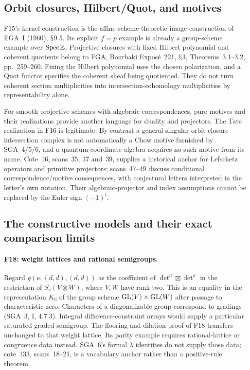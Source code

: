 \documentclass[11pt,a4paper]{article}
\renewcommand{\S}{\ensuremath{\mathsection}}
\newcommand{\fid}[1]{\textsf{#1}}\newcommand{\gate}[1]{\textsf{#1}}
\theoremstyle{named}\newtheorem{finding}{Finding}[section]
\theoremstyle{definition}\newtheorem{definition}[finding]{Definition}
\theoremstyle{remark}\newtheorem{remark}[finding]{Remark}
\begin{document}
\subsection{Orbit closures, Hilbert/Quot, and motives}
\fid{F15}'s kernel construction is the affine scheme-theoretic-image construction of EGA~I (1960), \S9.5. Its explicit $f=p$ example is already a group-scheme example over $\operatorname{Spec}\mathbb Z$. Projective closures with fixed Hilbert polynomial and coherent quotients belong to FGA, Bourbaki Expos\'e~221, \S3, Theorems~3.1--3.2, pp.~259--260. Fixing the Hilbert polynomial uses the chosen polarization, and a Quot functor specifies the coherent sheaf being quotiented. They do not turn coherent section multiplicities into intersection-cohomology multiplicities by representability alone.

For smooth projective schemes with algebraic correspondences, pure motives and their realizations provide another language for duality and projectors. The Tate realization in \fid{F16} is legitimate. By contrast a general singular orbit-closure intersection complex is not automatically a Chow motive furnished by SGA~4/5/6, and a quantum coordinate algebra acquires no such motive from its name. Cote~16, scans~35, 37 and~39, supplies a historical anchor for Lefschetz operators and primitive projectors; scans~47--49 discuss conditional correspondence/motive consequences, with conjectural letters interpreted in the letter's own notation. Their algebraic-projector and index assumptions cannot be replaced by the Euler sign $(-1)^i$.

\subsection{The constructive models and their exact comparison limits}
\paragraph{\fid{F18}: weight lattices and rational semigroups.}
Regard $g(\nu,(d,d),(d,d))$ as the coefficient of
$\det^d\boxtimes\det^d$ in the restriction of $S_\nu(V\otimes W)$,
where $V,W$ have rank two. This is an equality in the representation
$K_0$ of the group scheme $\mathrm{GL}(V)\times\mathrm{GL}(W)$ after passage to
characteristic zero. Characters of a diagonalizable group correspond
to gradings (SGA~3, I, 4.7.3). Integral difference-constraint arrays
would supply a particular saturated graded semigroup. The flooring
and dilation proof of \fid{F18} transfers unchanged to that weight
lattice. Its parity example requires rational-lattice or congruence
data instead. SGA~6's formal $\lambda$ identities do not supply those
data; cote~133, scans~18--21, is a vocabulary anchor rather than a
positive-rule theorem.
\end{document}
